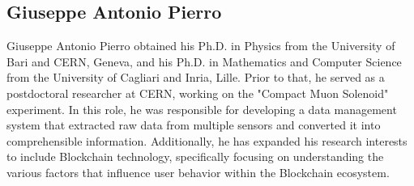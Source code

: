 \documentclass[10pt, conference, compsocconf]{IEEEtran}
\begin{document}
\subsection{Giuseppe Antonio Pierro}
Giuseppe Antonio Pierro obtained his Ph.D. in Physics from the University of Bari and CERN, Geneva,
and his Ph.D. in Mathematics and Computer Science from the University of Cagliari and Inria, Lille. 
Prior to that, he served as a postdoctoral researcher at CERN, working on the "Compact Muon Solenoid" experiment. In this role, he was responsible for developing a data management system that extracted raw data from multiple sensors and converted it into comprehensible information. 
Additionally, he has expanded his research interests to include Blockchain technology, specifically focusing on understanding the various factors that influence user behavior within the Blockchain ecosystem.



\end{document}

